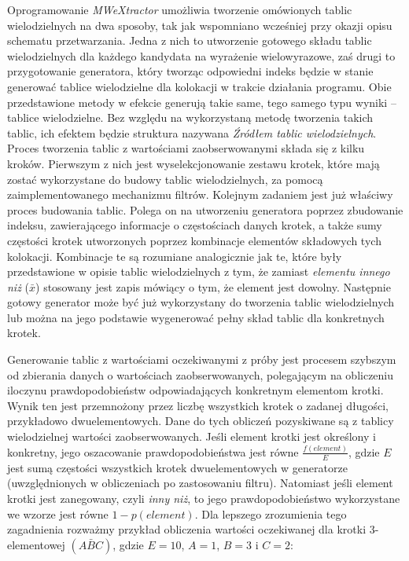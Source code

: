 \par
Oprogramowanie \emph{MWeXtractor} umożliwia tworzenie omówionych tablic wielodzielnych na dwa sposoby, tak jak wspomniano wcześniej przy okazji opisu schematu przetwarzania.
Jedna z nich to utworzenie gotowego składu tablic wielodzielnych dla każdego kandydata na wyrażenie wielowyrazowe, zaś drugi to przygotowanie generatora, który tworząc odpowiedni indeks będzie w stanie generować tablice wielodzielne dla kolokacji w trakcie działania programu.
Obie przedstawione metody w efekcie generują takie same, tego samego typu wyniki -- tablice wielodzielne.
Bez względu na wykorzystaną metodę tworzenia takich tablic, ich efektem będzie struktura nazywana \emph{Źródłem tablic wielodzielnych}.
Proces tworzenia tablic z wartościami zaobserwowanymi składa się z kilku kroków.
Pierwszym z nich jest wyselekcjonowanie zestawu krotek, które mają zostać wykorzystane do budowy tablic wielodzielnych, za pomocą zaimplementowanego mechanizmu filtrów.
Kolejnym zadaniem jest już właściwy proces budowania tablic.
Polega on na utworzeniu generatora poprzez zbudowanie indeksu, zawierającego informacje o częstościach danych krotek, a także sumy częstości krotek utworzonych poprzez kombinacje elementów składowych tych kolokacji.
Kombinacje te są rozumiane analogicznie jak te, które były przedstawione w opisie tablic wielodzielnych z tym, że zamiast \emph{elementu innego niż} ($ \bar{x} $) stosowany jest zapis mówiący o tym, że element jest dowolny.
Następnie gotowy generator może być już wykorzystany do tworzenia tablic wielodzielnych lub można na jego podstawie wygenerować pełny skład tablic dla konkretnych krotek.
\par
Generowanie tablic z wartościami oczekiwanymi z próby jest procesem szybszym od zbierania danych o wartościach zaobserwowanych, polegającym na obliczeniu iloczynu prawdopodobieństw odpowiadających konkretnym elementom krotki.
Wynik ten jest przemnożony przez liczbę wszystkich krotek o zadanej długości, przykładowo dwuelementowych.
Dane do tych obliczeń pozyskiwane są z tablicy wielodzielnej wartości zaobserwowanych.
Jeśli element krotki jest określony i konkretny, jego oszacowanie prawdopodobieństwa jest równe $ \frac{f(element)}{E} $, gdzie $ E $ jest sumą częstości wszystkich krotek dwuelementowych w generatorze (uwzględnionych w obliczeniach po zastosowaniu filtru).
Natomiast jeśli element krotki jest zanegowany, czyli \emph{inny niż}, to jego prawdopodobieństwo wykorzystane we wzorze jest równe $ 1 - p(element) $.
Dla lepszego zrozumienia tego zagadnienia rozważmy przykład obliczenia wartości oczekiwanej dla krotki 3-elementowej $ (A \bar{B} C) $, gdzie $ E = 10 $, $ A = 1 $, $ B = 3 $ i $ C = 2 $:

